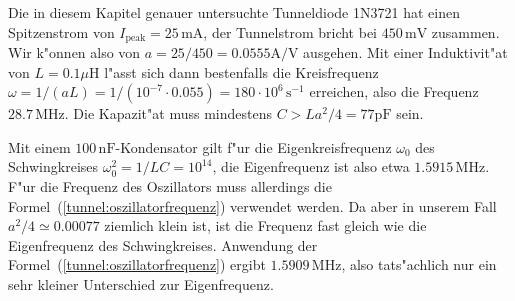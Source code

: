 \begin{beispiel}
Die in diesem Kapitel genauer untersuchte Tunneldiode 1N3721 hat einen
Spitzenstrom von $I_{\text{peak}}=25\,\text{mA}$, der Tunnelstrom
bricht bei $450\,\text{mV}$ zusammen.
Wir k"onnen also von $a=25/450=0.0555\text{A/V}$ ausgehen.
Mit einer Induktivit"at von $L=0.1\mu\text{H}$ l"asst sich dann bestenfalls
die Kreisfrequenz
$\omega=1/(aL)=1/(10^{-7}\cdot 0.055)=180\cdot 10^6\,\text{s}^{-1}$
erreichen,
also die Frequenz $28.7\,\text{MHz}$.
Die Kapazit"at muss mindestens $C>La^2/4=77\text{pF}$ sein.

Mit einem $100\,\text{nF}$-Kondensator gilt f"ur die Eigenkreisfrequenz
$\omega_0$ des Schwingkreises $\omega_0^2=1/LC=10^{14}$, die Eigenfrequenz
ist also etwa $1.5915\,\text{MHz}$.
F"ur die Frequenz des Oszillators muss allerdings die
Formel~(\ref{tunnel:oszillatorfrequenz}) verwendet werden.
Da aber in unserem Fall $a^2/4\simeq 0.00077$ ziemlich klein ist, ist
die Frequenz fast gleich wie die Eigenfrequenz des Schwingkreises.
Anwendung der Formel~(\ref{tunnel:oszillatorfrequenz})
ergibt $1.5909\,\text{MHz}$, also tats"achlich nur ein sehr kleiner
Unterschied zur Eigenfrequenz.
\end{beispiel}


